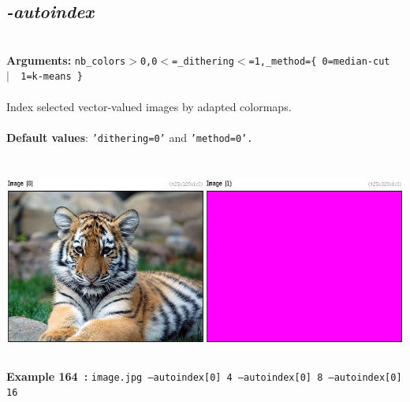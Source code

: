 \documentclass[a4paper,11pt,twoside]{book}
\begin{document}
\subsection{\emph{-autoindex} }\vspace*{-0.5em}
~\\\textbf{Arguments: } 
{\small \texttt{nb\_colors$>$0,0$<$=\_dithering$<$=1,\_method=\{ 0=median-cut ~$|$~ 1=k-means \}}}\\~\\
Index selected vector-valued images by adapted colormaps.
~\\~\\\textbf{Default values}: {\small \texttt{'dithering=0'} and \texttt{'method=0'.}}
\begin{center}\includegraphics[keepaspectratio=true,height=7cm,width=\textwidth]{img/gmic_def164.jpg}\\
{\footnotesize \textbf{Example 164~:} \texttt{image.jpg --autoindex[0] 4 --autoindex[0] 8 --autoindex[0] 16}}
\end{center}
\end{document}
